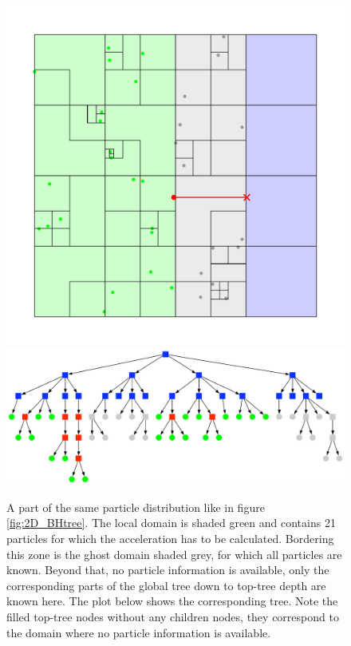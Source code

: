 \begin{figure}[htbp]
\begin{center}
\includegraphics[scale=0.6]{quadtree50_xy_TPL2.pdf}
\includegraphics[scale=0.3]{quadtree50_TPL2_stage3.pdf}
\caption{A part of the same particle distribution like in figure \ref{fig:2D_BHtree}. The local domain is shaded green and contains 21 particles for which the acceleration has to be calculated. Bordering this zone is the ghost domain shaded grey, for which all particles are known. Beyond that, no particle information is available, only the corresponding parts of the global tree down to top-tree depth are known here. The plot below shows the corresponding tree. Note the filled top-tree nodes without any children nodes, they correspond to the domain where no particle information is available.}
\label{fig:2D_BHtree_costzone}
\end{center}
\end{figure}
